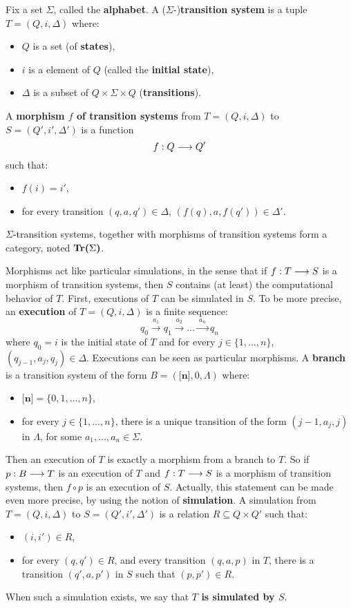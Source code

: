 	Fix a set $\Sigma$, called the \textbf{alphabet}. A ($\Sigma$-)\textbf{transition system} is a tuple $T = (Q,i,\Delta)$ where:
	\begin{itemize}
		\item $Q$ is a set (of \textbf{states}),
		\item $i$ is a element of $Q$ (called the \textbf{initial state}),
		\item $\Delta$ is a subset of $Q\times\Sigma\times Q$ (\textbf{transitions}).
	\end{itemize}
	
	
\noindent A \textbf{morphism $f$ of transition systems} from $T = (Q,i,\Delta)$ to $S = (Q',i',\Delta')$ is a function $$f : Q \longrightarrow Q'$$ such that:
	\begin{itemize}
		\item $f(i) = i'$,
		\item for every transition $(q,a,q') \in \Delta$, $(f(q),a,f(q')) \in \Delta'$.
	\end{itemize}
	$\Sigma$-transition systems, together with morphisms of transition systems form a category, noted $\textbf{Tr(}\Sigma\textbf{)}$.

	
	 Morphisms act like particular simulations, in the sense that if $f : T \longrightarrow S$ is a morphism of transition systems, then $S$ contains (at least) the computational behavior of $T$. First, executions of $T$ can be simulated in $S$. To be more precise, an \textbf{execution} of $T = (Q,i,\Delta)$ is a finite sequence:
	 $$q_0 \xrightarrow{~a_1~} q_1 \xrightarrow{~a_2~} \ldots \xrightarrow{~a_n~} q_n$$
	 where $q_0 = i$ is the initial state of $T$ and for every $j \in \{1, \ldots, n\}$, $(q_{j-1},a_j,q_j) \in \Delta$. Executions can be seen as particular morphisms. A \textbf{branch} is a transition system of the form $B = (\textbf{[n]},0,\Lambda)$ where:
	 \begin{itemize}
	 	\item $\textbf{[n]} = \{0,1,\ldots,n\}$,
		\item for every $j \in \{1, \ldots, n\}$, there is a unique transition of the form $(j-1,a_j,j)$ in $\Lambda$, for some $a_1, \ldots, a_n \in \Sigma$.
	\end{itemize}
	Then an execution of $T$ is exactly a morphism from a branch to $T$. So if $p : B \longrightarrow T$ is an execution of $T$ and $f : T \longrightarrow S$ is a morphism of transition systems, then $f\circ p$ is an execution of $S$. Actually, this statement can be made even more precise, by using the notion of \textbf{simulation}. A simulation from $T = (Q,i,\Delta)$ to $S = (Q',i',\Delta')$ is a relation $R \subseteq Q\times Q'$ such that:
	\begin{itemize}
		\item $(i,i') \in R$,
		\item for every $(q,q') \in R$, and every transition $(q,a,p)$ in $T$, there is a transition $(q',a,p')$ in $S$ such that $(p,p') \in R$.
	\end{itemize}
	When such a simulation exists, we say that \textbf{$T$ is simulated by $S$}.
	
